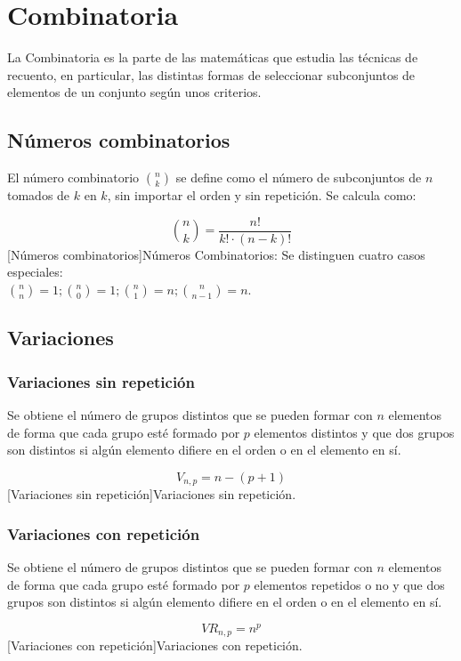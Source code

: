 \section{Combinatoria}
La Combinatoria es la parte de las matemáticas que estudia las técnicas de recuento, en particular, las distintas formas de seleccionar subconjuntos de elementos de un conjunto según unos criterios.
\subsection{Números combinatorios}
El número combinatorio ${n \choose k}$ se define como el número de subconjuntos de $n$ tomados de $k$ en $k$, sin importar el orden y sin repetición. Se calcula como:
\begin{center}
    \begin{equation}
        {n \choose k} = \dfrac{n!}{k!\cdot \left( n - k\right)! }
    \end{equation}
    [Números combinatorios]{Números Combinatorios: Se distinguen cuatro casos especiales:\protect\\
        ${n \choose n} = 1; {n \choose 0} = 1; {n \choose 1} = n; {n \choose n-1} = n$.}
\end{center}
\subsection{Variaciones}
\subsubsection{Variaciones sin repetición}
Se obtiene el número de grupos distintos que se pueden formar con $n$ elementos de forma que cada grupo esté formado por $p$ elementos distintos y que dos grupos son distintos si algún elemento difiere en el orden o en el elemento en sí.
\begin{center}
    \begin{equation}
       V_{n,p} = n - \left( p + 1\right) 
    \end{equation}
    [Variaciones sin repetición]{Variaciones sin repetición.}
\end{center}
\subsubsection{Variaciones con repetición}
Se obtiene el número de grupos distintos que se pueden formar con $n$ elementos de forma que cada grupo esté formado por $p$ elementos repetidos o no y que dos grupos son distintos si algún elemento difiere en el orden o en el elemento en sí.
\begin{center}
    \begin{equation}
        VR_{n,p} = n^p
    \end{equation}
    [Variaciones con repetición]{Variaciones con repetición.}
\end{center}
